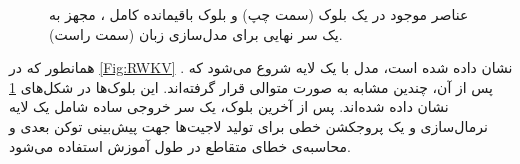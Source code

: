 \begin{figure}%
  \centering
  \qquad
  \caption{عناصر موجود در یک بلوک  (سمت چپ) و بلوک باقیمانده کامل ، مجهز به یک سر نهایی برای مدل‌سازی زبان (سمت راست).}%
  \label{Fig:RWKVB}%
\end{figure}

همانطور که در \ref{Fig:RWKV} نشان داده شده است،
مدل با یک لایه  شروع می‌شود که  . پس از آن، چندین   مشابه به صورت متوالی قرار گرفته‌اند. این بلوک‌ها در شکل‌های \ref{Fig:RWKVB} نشان داده شده‌اند. پس از آخرین بلوک، یک سر خروجی ساده شامل یک لایه نرمال‌سازی  و یک پروجکشن خطی برای تولید لاجیت‌ها  جهت پیش‌بینی توکن بعدی و محاسبه‌ی خطای متقاطع  در طول آموزش استفاده می‌شود.


